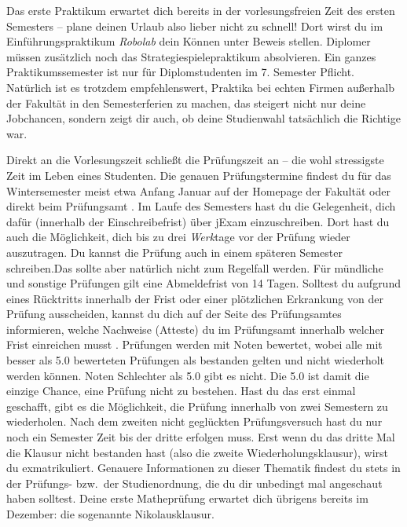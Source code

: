 Das erste Praktikum erwartet dich bereits in der vorlesungsfreien Zeit des ersten Semesters – plane deinen Urlaub also lieber nicht zu schnell!
Dort wirst du im Einführungspraktikum \textit{Robolab} dein Können unter Beweis stellen. Diplomer müssen zusätzlich noch das Strategiespielepraktikum absolvieren.
Ein ganzes Praktikumssemester ist nur für Diplomstudenten im 7. Semester Pflicht.
Natürlich ist es trotzdem empfehlenswert, Praktika bei echten Firmen außerhalb der Fakultät in den Semesterferien zu machen, das steigert nicht nur deine Jobchancen,
sondern zeigt dir auch, ob deine Studienwahl tatsächlich die Richtige war.

\label{sec:pruefungen}
Direkt an die Vorlesungszeit schließt die Prüfungszeit an – die wohl stressigste Zeit im Leben eines Studenten.
Die genauen Prüfungstermine findest du für das Wintersemester meist etwa Anfang Januar auf der Homepage der Fakultät  oder direkt beim Prüfungsamt .
Im Laufe des Semesters hast du die Gelegenheit, dich dafür (innerhalb der Einschreibefrist) über jExam einzuschreiben.
Dort hast du auch die Möglichkeit, dich bis zu drei \emph{Werk}tage vor der Prüfung wieder auszutragen. Du kannst die Prüfung auch in einem späteren Semester schreiben.Das sollte aber natürlich nicht zum Regelfall werden. Für mündliche und sonstige Prüfungen gilt eine Abmeldefrist von 14 Tagen.
Solltest du aufgrund eines Rücktritts innerhalb der Frist oder einer plötzlichen Erkrankung von der Prüfung ausscheiden, kannst du dich auf der Seite des Prüfungsamtes informieren,
welche Nachweise (Atteste) du im Prüfungsamt innerhalb welcher Frist einreichen musst .
Prüfungen werden mit Noten bewertet, wobei alle mit besser als 5.0 bewerteten Prüfungen als bestanden gelten und nicht wiederholt werden können.
Noten Schlechter als 5.0 gibt es nicht.
Die 5.0 ist damit die einzige Chance, eine Prüfung nicht zu bestehen.
Hast du das erst einmal geschafft, gibt es die Möglichkeit, die Prüfung innerhalb von zwei Semestern zu wiederholen.
Nach dem zweiten nicht geglückten Prüfungsversuch hast du nur noch ein Semester Zeit bis der dritte erfolgen muss.
Erst wenn du das dritte Mal die Klausur nicht bestanden hast (also die zweite Wiederholungsklausur), wirst du exmatrikuliert.
Genauere Informationen zu dieser Thematik findest du stets in der Prüfungs- bzw.\ der Studienordnung, die du dir unbedingt mal angeschaut haben solltest.
Deine erste Matheprüfung erwartet dich übrigens bereits im Dezember: die sogenannte Nikolausklausur.

